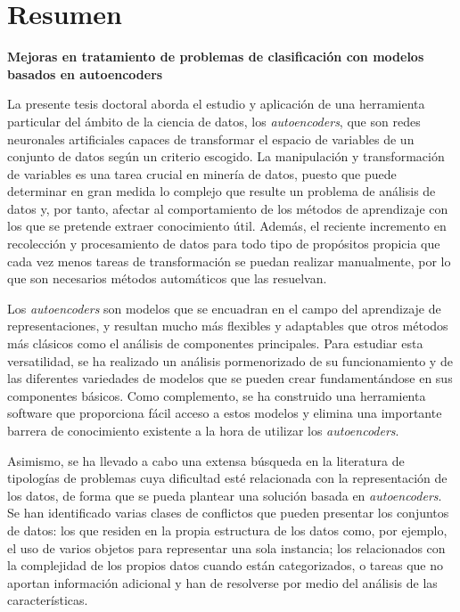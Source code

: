 \chapter*{Resumen}

\begin{center}
\textbf{Mejoras en tratamiento de problemas de clasificación con modelos basados en autoencoders}
\end{center}

La presente tesis doctoral aborda el estudio y aplicación de una herramienta particular del ámbito de la ciencia de datos, los \textit{autoencoders}, que son redes neuronales artificiales capaces de transformar el espacio de variables de un conjunto de datos según un criterio escogido. La manipulación y transformación de variables es una tarea crucial en minería de datos, puesto que puede determinar en gran medida lo complejo que resulte un problema de análisis de datos y, por tanto, afectar al comportamiento de los métodos de aprendizaje con los que se pretende extraer conocimiento útil. Además, el reciente incremento en recolección y procesamiento de datos para todo tipo de propósitos propicia que cada vez menos tareas de transformación se puedan realizar manualmente, por lo que son necesarios métodos automáticos que las resuelvan. 

Los \textit{autoencoders} son modelos que se encuadran en el campo del aprendizaje de representaciones, y resultan mucho más flexibles y adaptables que otros métodos más clásicos como el análisis de componentes principales. Para estudiar esta versatilidad, se ha realizado un análisis pormenorizado de su funcionamiento y de las diferentes variedades de modelos que se pueden crear fundamentándose en sus componentes básicos. Como complemento, se ha construido una herramienta software que proporciona fácil acceso a estos modelos y elimina una importante barrera de conocimiento existente a la hora de utilizar los \textit{autoencoders}.

Asimismo, se ha llevado a cabo una extensa búsqueda en la literatura de tipologías de problemas cuya dificultad esté relacionada con la representación de los datos, de forma que se pueda plantear una solución basada en \textit{autoencoders}. Se han identificado varias clases de conflictos que pueden presentar los conjuntos de datos: los que residen en la propia estructura de los datos como, por ejemplo, el uso de varios objetos para representar una sola instancia; los relacionados con la complejidad de los propios datos cuando están categorizados, o tareas que no aportan información adicional y han de resolverse por medio del análisis de las características.

